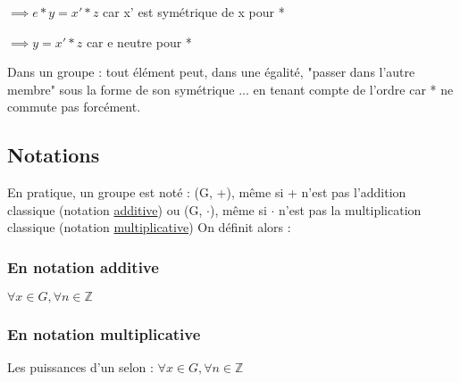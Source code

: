 \documentclass[12pt,a4paper,french]{book}
\begin{document}
\begin{spacing}{1.0}
			\(\implies e * y = x' * z\) car x' est symétrique de x pour *
			
			\(\implies y = x' * z\) car e neutre pour *
			
			Dans un groupe : tout élément peut, dans une égalité, "passer dans l'autre membre" sous la forme de son symétrique ... en tenant compte de l'ordre car * ne commute pas forcément.
		\subsection{Notations}
		En pratique, un groupe est noté : 
		(G, +), même si + n'est pas l'addition classique (notation \underline{additive}) ou (G, \(\cdot\)), même si \(\cdot\) n'est pas la multiplication classique (notation \underline{multiplicative})
		On définit alors : 
			\subsubsection{En notation additive}
			\(\forall x \in G, \forall n \in \mathbb{Z}\)
			
			\begin{center}
			\end{center}
			\subsubsection{En notation multiplicative}
			Les puissances d'un selon : \(\forall x \in G, \forall n \in \mathbb{Z}\)
			
			\begin{center}
			\end{center}

\end{spacing}
\end{document}
